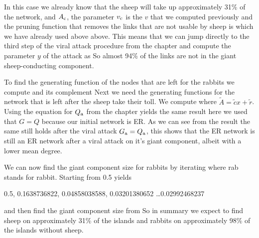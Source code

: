 In this case we already know that the sheep will take up approximately 31\% of the network, and $A_{\rm c}$, the parameter $v_{\rm c}$ is the $v$ that we computed previously and the pruning function that removes the links that are not usable by sheep is 
which we have already used above above. This means that we can jump directly to the third step of the viral attack procedure from the chapter and compute the parameter $y$ of the attack as 
So almost 94\% of the links are not in the giant sheep-conducting component.

To find the generating function of the nodes that are left for the rabbits we compute
and its complement
Next we need the generating functions for the network that is left after the sheep take their toll. We compute 
where $\tilde{A}=\tilde{c}x+\tilde{r}$. Using the equation for $Q_{\rm a}$ from the chapter yields the same result
here we used that $G=Q$ because our initial network is ER. As we can see from the result the same still holds after the viral attack $G_{\rm a}=Q_{\rm a}$, this shows that the ER network is still an ER network after a viral attack on it's giant component, albeit with a lower mean degree. 

We can now find the giant component size for rabbits by iterating 
where rab stands for rabbit. Starting from 0.5 yields 
\begin{center}
    0.5, 0.1638736822, 0.04858038588, 0.03201380652 \ldots 0.02992468237 
\end{center}
and then find the giant component size from
So in summary we expect to find sheep on approximately 31\% of the islands and rabbits on approximately 98\% of the islands without sheep.   
